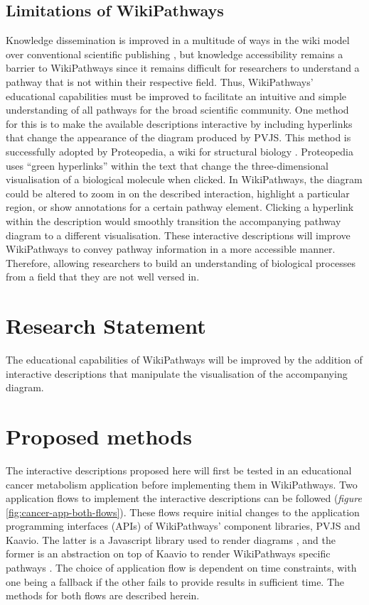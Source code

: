 \documentclass[a4paper,12pt,twoside]{apa}
\begin{document}
\subsection{Limitations of WikiPathways}

Knowledge dissemination is improved in a multitude of ways in the wiki model over conventional scientific publishing \cite{hoffmann2008wiki}, but knowledge accessibility remains a  barrier to WikiPathways since it remains difficult for researchers to understand a pathway that is not within their respective field. Thus, WikiPathways' educational capabilities must be improved to facilitate an intuitive and simple understanding of all pathways for the broad scientific community. One method for this is to make the available descriptions interactive by including hyperlinks that change the appearance of the diagram produced by PVJS. This method is successfully adopted by Proteopedia, a wiki for structural biology \cite{hodis2008proteopedia}. Proteopedia uses ``green hyperlinks'' within the text that change the three-dimensional visualisation of a biological molecule when clicked. In WikiPathways, the diagram could be altered to zoom in on the described interaction, highlight a particular region, or show annotations for a certain pathway element. Clicking a hyperlink within the description would smoothly transition the accompanying pathway diagram to a different visualisation. These interactive descriptions will improve WikiPathways to convey pathway information in a more accessible manner. Therefore, allowing researchers to build an understanding of biological processes from a field that they are not well versed in.

\section{Research Statement}
The educational capabilities of WikiPathways will be improved by the addition of interactive descriptions that manipulate the visualisation of the accompanying diagram.

\section{Proposed methods}
The interactive descriptions proposed here will first be tested in an educational cancer metabolism application before implementing them in WikiPathways. Two application flows to implement the interactive descriptions can be followed (\textit{figure} \ref{fig:cancer-app-both-flows}). These flows require initial changes to the application programming interfaces (APIs) of WikiPathways' component libraries, PVJS and Kaavio. The latter is a Javascript library used to render diagrams \cite{kaavio}, and the former is an abstraction on top of Kaavio to render WikiPathways specific pathways \cite{PVJS}. The choice of application flow is dependent on time constraints, with one being a fallback if the other fails to provide results in sufficient time. The methods for both flows are described herein.
\end{document}

